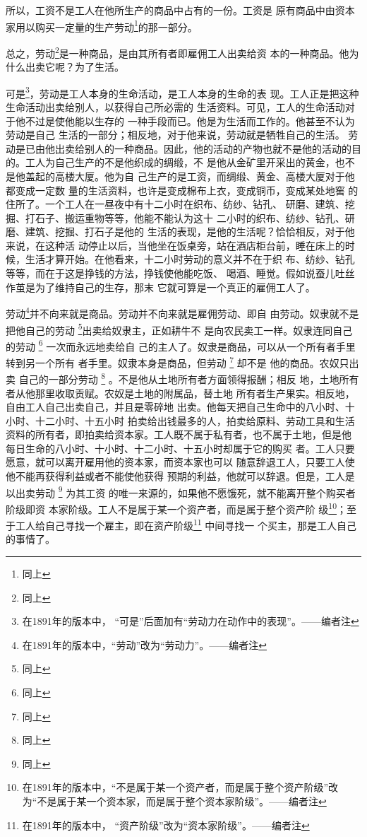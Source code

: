 \documentclass[a4paper,twoside,12pt,AutoFakeBold]{ctexart}
\begin{document}
所以，工资不是工人在他所生产的商品中占有的一份。工资是
原有商品中由资本家用以购买一定量的生产劳动\footnote{同上}的那一部分。

总之，劳动\footnote{同上}是一种商品，是由其所有者即雇佣工人出卖给资
本的一种商品。他为什么出卖它呢？为了生活。

可是\footnote{在1891年的版本中， “可是”后面加有“劳动力在动作中的表现”。——编者注}，劳动是工人本身的生命活动，是工人本身的生命的表
现。工人正是把这种生命活动出卖给别人，以获得自己所必需的
生活资料。可见，工人的生命活动对于他不过是使他能以生存的
一种手段而已。他是为生活而工作的。他甚至不认为劳动是自己
生活的一部分；相反地，对于他来说，劳动就是牺牲自己的生活。
劳动是已由他出卖给别人的一种商品。因此，他的活动的产物也就不是他的活动的目的。工人为自己生产的不是他织成的绸缎，不
是他从金矿里开采出的黄金，也不是他盖起的高楼大厦。他为自
己生产的是工资，而绸缎、黄金、高楼大厦对于他都变成一定数
量的生活资料，也许是变成棉布上衣，变成铜币，变成某处地窖
的住所了。一个工人在一昼夜中有十二小时在织布、纺纱、钻孔、
研磨、建筑、挖掘、打石子、搬运重物等等，他能不能认为这十
二小时的织布、纺纱、钻孔、研磨、建筑、挖掘、打石子是他的
生活的表现，是他的生活呢？恰恰相反，对于他来说，在这种活
动停止以后，当他坐在饭桌旁，站在酒店柜台前，睡在床上的时
候，生活才算开始。在他看来，十二小时劳动的意义并不在于织
布、纺纱、钻孔等等，而在于这是挣钱的方法，挣钱使他能吃饭、
喝酒、睡觉。假如说蚕儿吐丝作茧是为了维持自己的生存，那末
它就可算是一个真正的雇佣工人了。

劳动\footnote{在1891年的版本中，“劳动”改为“劳动力”。——编者注}并不向来就是商品。劳动并不向来就是雇佣劳动、即自
由劳动。奴隶就不是把他自己的劳动 \footnote{同上}出卖给奴隶主，正如耕牛不
是向农民卖工一样。奴隶连同自己的劳动 \footnote{同上} 一次而永远地卖给自
己的主人了。奴隶是商品，可以从一个所有者手里转到另一个所有
者手里。奴隶本身是商品，但劳动  \footnote{同上} 却不是 他的商品。农奴只出卖
自己的一部分劳动  \footnote{同上} 。不是他从土地所有者方面领得报酬；相反
地，土地所有者从他那里收取贡赋。农奴是土地的附属品，替土地
所有者生产果实。相反地，自由工人自己出卖自己，并且是零碎地
出卖。他每天把自己生命中的八小时、十小时、十二小时、十五小时
拍卖给出钱最多的人，拍卖给原料、劳动工具和生活资料的所有者，即拍卖给资本家。工人既不属于私有者，也不属于土地，但是他
每日生命的八小时、十小时、十二小时、十五小时却属于它的购买
者。工人只要愿意，就可以离开雇用他的资本家，而资本家也可以
随意辞退工人，只要工人使他不能再获得利益或者不能使他获得
预期的利益，他就可以辞退。但是，工人是以出卖劳动 \footnote{同上} 为其工资
的唯一来源的，如果他不愿饿死，就不能离开整个购买者阶级即资
本家阶级。工人不是属于某一个资产者，而是属于整个资产阶
级\footnote{在1891年的版本中，“不是属于某一个资产者，而是属于整个资产阶级”改为“不是属于某一个资本家，而是属于整个资本家阶级”。——编者注}；至于工人给自己寻找一个雇主，即在资产阶级\footnote{在1891年的版本中， “资产阶级”改为“资本家阶级”。——编者注} 中间寻找一
个买主，那是工人自己的事情了。
\end{document}
